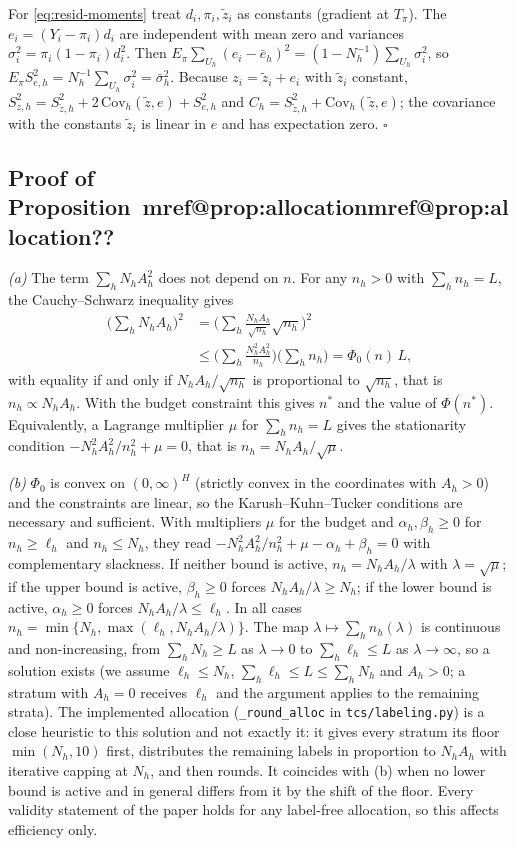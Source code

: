 \documentclass[pdflatex,sn-mathphys-num,iicol]{sn-jnl}
\makeatletter
\theoremstyle{thmstyleone}
\theoremstyle{thmstyletwo}
\theoremstyle{thmstylethree}
\newcommand{\Mref}[1]{\ifcsname mref@#1\endcsname\csname mref@#1\endcsname\else\textbf{??}\fi}
\makeatother
\begin{document}
For \eqref{eq:resid-moments} treat $d_i,\pi_i,\tilde z_i$ as constants (gradient at $T_\pi$). The $e_i=(Y_i-\pi_i)d_i$ are independent with mean zero and variances $\sigma_i^2=\pi_i(1-\pi_i)d_i^2$.
Then $E_\pi\sum_{U_h}(e_i-\bar e_h)^2=(1-N_h^{-1})\sum_{U_h}\sigma_i^2$, so $E_\pi S^2_{e,h}=N_h^{-1}\sum_{U_h}\sigma_i^2=\bar\sigma^2_h$. Because $z_i=\tilde z_i+e_i$ with $\tilde z_i$ constant,
$S^2_{z,h}=S^2_{\tilde z,h}+2\,\mathrm{Cov}_h(\tilde z,e)+S^2_{e,h}$ and $C_h=S^2_{\tilde z,h}+\mathrm{Cov}_h(\tilde z,e)$; the covariance with the constants $\tilde z_i$ is linear in $e$ and has expectation zero.
$\square$

\subsection{Proof of Proposition~\Mref{prop:allocation}}

\emph{(a)} The term $\sum_hN_hA_h^2$ does not depend on $n$. For any $n_h>0$ with $\sum_hn_h=L$, the
Cauchy--Schwarz inequality gives
\begin{align*}
\Big(\sum_hN_hA_h\Big)^2&=\Big(\sum_h\frac{N_hA_h}{\sqrt{n_h}}\sqrt{n_h}\Big)^2\\
&\le\Big(\sum_h\frac{N_h^2A_h^2}{n_h}\Big)\Big(\sum_hn_h\Big)=\Phi_0(n)\,L,
\end{align*}
with equality if and only if $N_hA_h/\sqrt{n_h}$ is proportional to $\sqrt{n_h}$, that is
$n_h\propto N_hA_h$. With the budget constraint this gives $n^\ast$ and the value of $\Phi(n^\ast)$.
Equivalently, a Lagrange multiplier $\mu$ for $\sum_hn_h=L$ gives the stationarity condition
$-N_h^2A_h^2/n_h^2+\mu=0$, that is $n_h=N_hA_h/\sqrt\mu$.

\emph{(b)} $\Phi_0$ is convex on $(0,\infty)^H$ (strictly convex in the coordinates with $A_h>0$)
and the constraints are linear, so the Karush--Kuhn--Tucker conditions are necessary and sufficient.
With multipliers $\mu$ for the budget and $\alpha_h,\beta_h\ge0$ for $n_h\ge\ell_h$ and
$n_h\le N_h$, they read $-N_h^2A_h^2/n_h^2+\mu-\alpha_h+\beta_h=0$ with complementary slackness. If
neither bound is active, $n_h=N_hA_h/\lambda$ with $\lambda=\sqrt\mu$; if the upper bound is active,
$\beta_h\ge0$ forces $N_hA_h/\lambda\ge N_h$; if the lower bound is active, $\alpha_h\ge0$ forces
$N_hA_h/\lambda\le\ell_h$. In all cases $n_h=\min\{N_h,\max(\ell_h,N_hA_h/\lambda)\}$. The map
$\lambda\mapsto\sum_hn_h(\lambda)$ is continuous and non-increasing, from $\sum_hN_h\ge L$ as
$\lambda\to0$ to $\sum_h\ell_h\le L$ as $\lambda\to\infty$, so a solution exists (we assume $\ell_h\le N_h$, $\sum_h\ell_h\le L\le\sum_hN_h$ and $A_h>0$; a stratum with $A_h=0$ receives
$\ell_h$ and the argument applies to the remaining strata). The implemented allocation (\texttt{\_round\_alloc} in \texttt{tcs/labeling.py}) is a close heuristic to this solution and not exactly it: it
gives every stratum its floor $\min(N_h,10)$ first, distributes the remaining labels in proportion to $N_hA_h$ with iterative capping at $N_h$, and then rounds. It
coincides with (b) when no lower bound is active and in general differs from it by the shift of the floor. Every validity statement of the paper holds for any label-free allocation, so this affects efficiency only.
\end{document}
